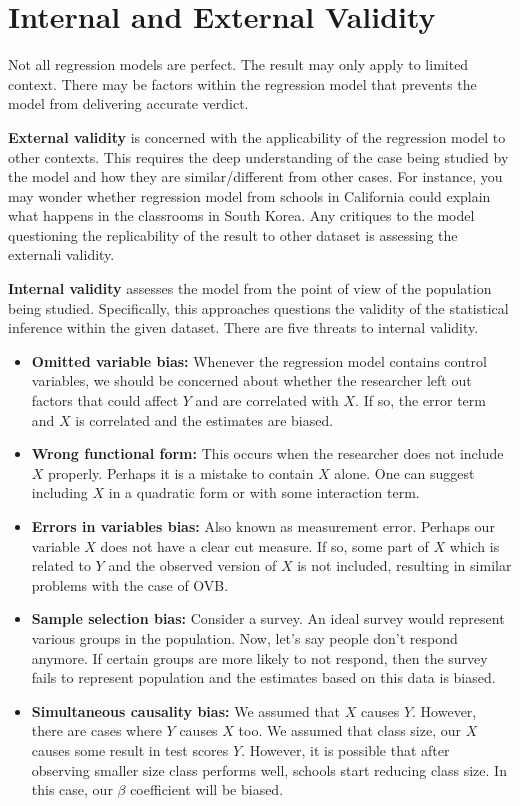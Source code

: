 \section{Internal and External Validity}
Not all regression models are perfect. The result may only apply to limited context. There may be factors within the regression model that prevents the model from delivering accurate verdict. \par\medskip
\textbf{External validity} is concerned with the applicability of the regression model to other contexts. This requires the deep understanding of the case being studied by the model and how they are similar/different from other cases. For instance, you may wonder whether regression model from schools in California could explain what happens in the classrooms in South Korea. Any critiques to the model questioning the replicability of the result to other dataset is assessing the externali validity. \par\medskip
\textbf{Internal validity} assesses the model from the point of view of the population being studied. Specifically, this approaches questions the validity of the statistical inference within the given dataset. There are five threats to internal validity.
\begin{itemize}
\item \textbf{Omitted variable bias: }Whenever the regression model contains control variables, we should be concerned about whether the researcher left out factors that could affect $Y$ and are correlated with $X$. If so, the error term and $X$ is correlated and the estimates are biased. 
\item \textbf{Wrong functional form: }This occurs when the researcher does not include $X$ properly. Perhaps it is a mistake to contain $X$ alone. One can suggest including $X$ in a quadratic form or with some interaction term.  
\item \textbf{Errors in variables bias: }Also known as measurement error. Perhaps our variable $X$ does not have a clear cut measure. If so, some part of $X$ which is related to $Y$ and the observed version of $X$ is not included, resulting in similar problems with the case of OVB.
\item \textbf{Sample selection bias: }Consider a survey. An ideal survey would represent various groups in the population. Now, let's say people don't respond anymore. If certain groups are more likely to not respond, then the survey fails to represent population and the estimates based on this data is biased.
\item \textbf{Simultaneous causality bias: }We assumed that $X$ causes $Y$. However, there are cases where $Y$ causes $X$ too.  We assumed that class size,  our $X$ causes some result in test scores $Y$. However, it is possible that after observing smaller size class performs well, schools start reducing class size. In this case, our $\beta$ coefficient will be biased. 
\end{itemize}



